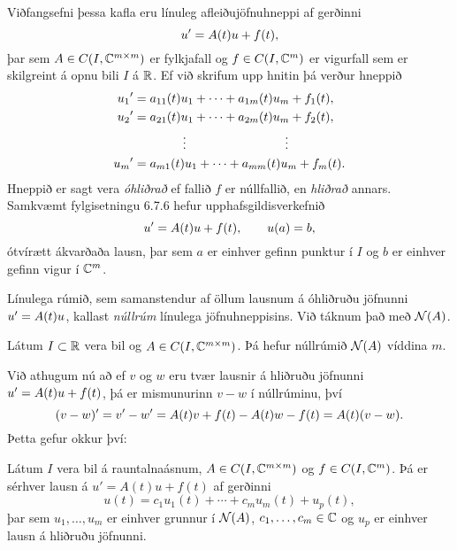 \noindent
Viðfangsefni þessa kafla eru línuleg afleiðujöfnuhneppi  af gerðinni
 \begin{equation*}u{\sp{\prime}}=A(t)u+f(t),\label{5.1.1}
 \end{equation*}
þar sem $A\in C(I,{\mathbb C}^{m\times m})$ er fylkjafall og $f\in C(I,{\mathbb C}^m)$ 
er vigurfall sem er skilgreint á opnu bili $I$ á ${\mathbb R}$.  Ef við skrifum upp
hnitin þá verður hneppið 
\begin{align*}
u_1{\sp{\prime}}&=a_{11}(t)u_1+\cdots+a_{1m}(t)u_m+f_1(t),\\
u_2{\sp{\prime}}&=a_{21}(t)u_1+\cdots+a_{2m}(t)u_m+f_2(t),\\
&\qquad \qquad \vdots\qquad \qquad \qquad \qquad \vdots\\
u_m{\sp{\prime}}&=a_{m1}(t)u_1+\cdots+a_{mm}(t)u_m+f_m(t).
\end{align*}
Hneppið er sagt vera {\it
óhliðrað} ef
fallið $f$ er núllfallið, en {\it
hliðrað} annars.   Samkvæmt
fylgisetningu 6.7.6  hefur upphafsgildisverkefnið
\begin{equation*}
u{\sp{\prime}}=A(t)u+f(t), \qquad u(a)=b,\label{5.1.2}
\end{equation*}
ótvírætt ákvarðaða lausn, þar sem $a$ er einhver gefinn punktur í $I$
og $b$ er einhver gefinn vigur í ${\mathbb C}^m$.  

\begin{sk}
Línulega rúmið, sem samanstendur af öllum lausnum á óhliðruðu
jöfnunni $u{\sp{\prime}}=A(t)u$, kallast {\it
núllrúm
} línulega
jöfnuhneppisins.  Við táknum það með ${\cal N}(A)$.
\end{sk}


\begin{se}
Látum $I\subset {\mathbb R}$ vera bil og $A\in C(I,{\mathbb C}\sp
{m\times m})$. Þá hefur núllrúmið ${\cal N}(A)$ víddina $m$.
\end{se}

Við athugum nú að ef $v$ og $w$ eru tvær lausnir á hliðruðu jöfnunni
$u{\sp{\prime}}=A(t)u+f(t)$, þá er mismunurinn $v-w$ í núllrúminu, því
 $$(v-w){\sp{\prime}}=v{\sp{\prime}}-w{\sp{\prime}}=A(t)v+f(t)-A(t)w-f(t)=A(t)(v-w).
 $$
Þetta gefur okkur því:

\begin{se}  
Látum $I$ vera bil á rauntalnaásnum, $A\in C(I,{\mathbb C}\sp
{m\times m})$ og $f\in C(I,{\mathbb C}\sp m)$.
Þá er sérhver lausn á $u'=A(t)u+f(t)$ af gerðinni
$$ u(t)=c_1u_1(t)+\cdots+c_mu_m(t)+u_p(t),$$
þar sem $u_1,\dots,u_m$ er einhver grunnur í ${\cal N}(A)$,
$c_1,\dots,c_m\in{\mathbb C}$ og $u_p$ er einhver lausn á hliðruðu jöfnunni.
\end{se}

